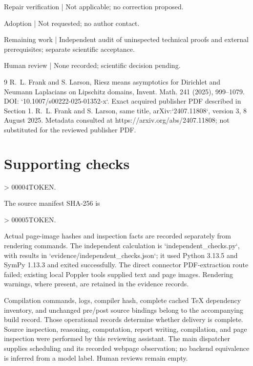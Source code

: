 \documentclass[10pt]{article}
\begin{document}
Repair verification | Not applicable; no correction proposed.\par
Adoption | Not requested; no author contact.\par
Remaining work | Independent audit of uninspected technical proofs and external prerequisites; separate scientific acceptance.\par
Human review | None recorded; scientific decision pending.\par
9 R. L. Frank and S. Larson, Riesz means asymptotics for Dirichlet and Neumann Laplacians on Lipschitz domains, Invent. Math. 241 (2025), 999–1079. DOI: `10.1007/s00222-025-01352-x`. Exact acquired publisher PDF described in Section 1. R. L. Frank and S. Larson, same title, arXiv:`2407.11808`, version 3, 8 August 2025. Metadata consulted at https://arxiv.org/abs/2407.11808; not substituted for the reviewed publisher PDF.\par
\section*{Supporting checks}
> 00004TOKEN.\par
The source manifest SHA-256 is\par
> 00005TOKEN.\par
Actual page-image hashes and inspection facts are recorded separately from rendering commands. The independent calculation is `independent\_checks.py`, with results in `evidence/independent\_checks.json`; it used Python 3.13.5 and SymPy 1.13.3 and exited successfully. The direct connector PDF-extraction route failed; existing local Poppler tools supplied text and page images. Rendering warnings, where present, are retained in the evidence records.\par
Compilation commands, logs, compiler hash, complete cached TeX dependency inventory, and unchanged pre/post source bindings belong to the accompanying build record. Those operational records determine whether delivery is complete. Source inspection, reasoning, computation, report writing, compilation, and page inspection were performed by this reviewing assistant. The main dispatcher supplies scheduling and its recorded webpage observation; no backend equivalence is inferred from a model label. Human reviews remain empty.\par
\end{document}
